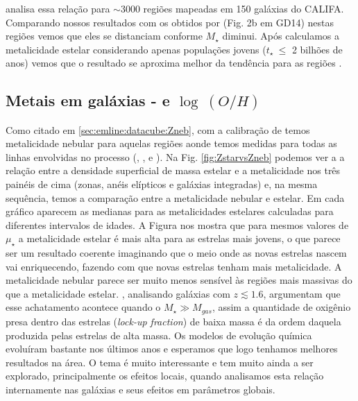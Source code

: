 \citet{Sanchez.etal.2013a} analisa essa relação para $\sim 3000$ regiões \Hii mapeadas em 150
galáxias do CALIFA. Comparando nossos resultados com os obtidos por \citeauthor{Sanchez.etal.2013a}
(Fig. 2b em GD14) nestas regiões vemos que eles se distanciam conforme $M_\star$ diminui.
Após calculamos a metalicidade estelar considerando apenas populações jovens ($t_\star\ \leq$ 2
bilhões de anos) vemos que o resultado se aproxima melhor da tendência para as regiões \Hii.

\subsection{Metais em galáxias -  e $\log\ (O/H)$}
\label{sec:synvsneb:ZemuZR}

Como citado em \ref{sec:emline:datacube:Zneb}, com a calibração de \citet{Marino.etal.2013a} temos
metalicidade nebular para aquelas regiões aonde temos medidas para todas as linhas envolvidas no
processo (\Hbeta, \oIII, \Halpha e \nII). Na Fig. \ref{fig:ZstarvsZneb} podemos ver a a relação
entre a densidade superficial de massa estelar e a metalicidade nos três painéis de cima (zonas,
anéis elípticos e galáxias integradas) e, na mesma sequência, temos a comparação entre a
metalicidade nebular e estelar. Em cada gráfico aparecem as medianas para as metalicidades estelares
calculadas para diferentes intervalos de idades. A Figura nos mostra que para mesmos valores de
$\mu_\star$ a metalicidade estelar é mais alta para as estrelas mais jovens, o que parece ser um
resultado coerente imaginando que o meio onde as novas estrelas nascem vai enriquecendo, fazendo com
que novas estrelas tenham mais metalicidade. A metalicidade nebular parece ser muito menos sensível
às regiões mais massivas do que a metalicidade estelar. \citet{Zahid.etal.2014a}, analisando
galáxias com $z \lesssim 1.6$, argumentam que esse achatamento acontece quando o $M_\star \gg
M_{gas}$, assim a quantidade de oxigênio presa dentro das estrelas ({\em lock-up fraction}) de baixa
massa é da ordem daquela produzida pelas estrelas de alta massa. Os modelos de evolução química
evoluíram bastante nos últimos anos \citep[e.g., ][]{Lilly.etal.2013a, Peng.Maiolino.2014a,
Ascasibar.etal.2015a, Peng.Maiolino.Cochrane.2015a} e esperamos que logo tenhamos melhores
resultados na área. O tema é muito interessante e tem muito ainda a ser explorado, principalmente os
efeitos locais, quando analisamos esta relação internamente nas galáxias e seus efeitos em
parâmetros globais.

